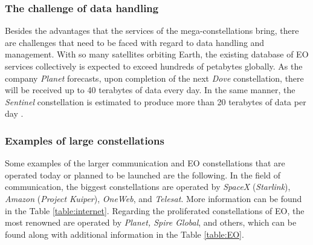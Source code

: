 \bigskip
\subsubsection{The challenge of data handling}
\bigskip
Besides the advantages that the services of the mega-constellations bring, there are challenges that need to be faced with regard to data handling and management. With so many satellites orbiting Earth, the existing database of EO services collectively is expected to exceed hundreds of petabytes globally. As the company \textit{Planet} forecasts, upon completion of the next \textit{Dove} constellation, there will be received up to 40 terabytes of data every day. In the same manner, the \textit{Sentinel} constellation is estimated to produce more than 20 terabytes of data per day \cite{LE_Esteve}.

\bigskip
\subsubsection{Examples of large constellations}
\bigskip
Some examples of the larger communication and EO constellations that are operated today or planned to be launched are the following. In the field of communication, the biggest constellations are operated by \textit{SpaceX} (\textit{Starlink}), \textit{Amazon} (\textit{Project Kuiper}), \textit{OneWeb}, and \textit{Telesat}. More information can be found in the Table \ref{table:internet}. Regarding the proliferated constellations of EO, the most renowned are operated by \textit{Planet, Spire Global}, and others, which can be found along with additional information in the Table \ref{table:EO}.



